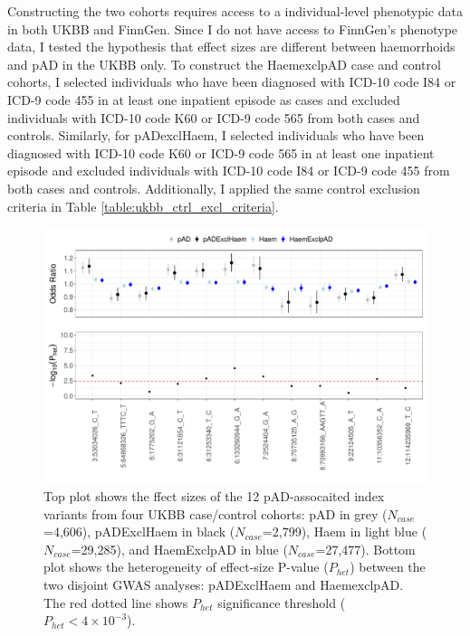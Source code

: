 Constructing the two cohorts requires access to a individual-level phenotypic data in both UKBB and FinnGen. Since I do not have access to FinnGen's phenotype data, I tested the hypothesis that effect sizes are different between haemorrhoids and pAD in the UKBB only. To construct the HaemexclpAD case and control cohorts, I selected individuals who have been diagnosed with ICD-10 code I84 or ICD-9 code 455 in at least one inpatient episode as cases and excluded individuals with ICD-10 code K60 or ICD-9 code 565 from both cases and controls. Similarly, for pADexclHaem, I selected individuals who have been diagnosed with ICD-10 code K60 or ICD-9 code 565 in at least one inpatient episode and excluded individuals with ICD-10 code I84 or ICD-9 code 455 from both cases and controls. Additionally, I applied the same control exclusion criteria in Table \ref{table:ukbb_ctrl_excl_criteria}. 

\begin{figure}[H]
  \centering    
  \includegraphics[width=1.0\textwidth]{combined_forest_het_plt}
  \caption[Figure]{Top plot shows the ffect sizes of the 12 pAD-assocaited index variants from four UKBB case/control cohorts: pAD in grey ($N_{case}$=4,606), pADExclHaem in black ($N_{case}$=2,799), Haem in light blue ($N_{case}$=29,285), and HaemExclpAD in blue ($N_{case}$=27,477). Bottom plot shows the heterogeneity of effect-size P-value ($P_{het}$) between the two disjoint GWAS analyses: pADExclHaem and HaemexclpAD. The red dotted line shows $P_{het}$ significance threshold ($P_{het} < 4\times10^{-3}$).}
  \label{fig:combined_forest_het_plot}
  \end{figure}

